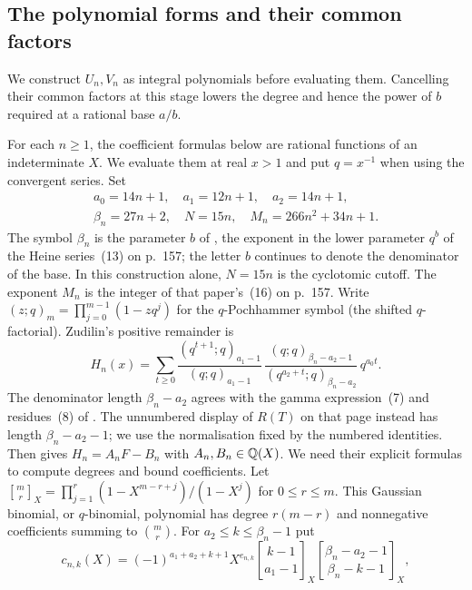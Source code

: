 \documentclass[11pt]{article}
\begin{document}
\subsection{The polynomial forms and their common factors}\label{long1049:sec:source-forms}

We construct $U_n,V_n$ as integral polynomials before evaluating
them. Cancelling their common factors at this stage lowers the degree
and hence the power of $b$ required at a rational base $a/b$.

For each $n\ge1$, the coefficient formulas below are rational functions
of an indeterminate $X$. We evaluate them at real $x>1$ and put $q=x^{-1}$
when using the convergent series. Set
\[
\begin{gathered}
 a_0=14n+1,\quad a_1=12n+1,\quad a_2=14n+1,\\
 \beta_n=27n+2,\quad N=15n,\quad M_n=266n^{2}+34n+1 .
\end{gathered}
\]
The symbol $\beta_n$ is the parameter $b$ of \cite[Sec.~3, p.~155]{zudilin2004},
the exponent in the lower parameter $q^{b}$ of the Heine series~(13) on p.~157;
the letter $b$ continues to
denote the denominator of the base. In this construction alone,
$N=15n$ is the cyclotomic cutoff. The exponent $M_n$ is the integer
of that paper's~(16) on p.~157. Write
$(z;q)_m=\prod_{j=0}^{m-1}(1-zq^{j})$ for the $q$-Pochhammer symbol
(the shifted $q$-factorial). Zudilin's positive remainder is
\begin{equation}\label{long1049:eq:positive-source-form}
 H_n(x)=\sum_{t\ge0}
 \frac{(q^{t+1};q)_{a_1-1}}{(q;q)_{a_1-1}}\,
 \frac{(q;q)_{\beta_n-a_2-1}}{(q^{a_2+t};q)_{\beta_n-a_2}}\,q^{a_0t}.
\end{equation}
The denominator length $\beta_n-a_2$ agrees with the gamma
expression~(7) and residues~(8) of \cite[p.~156]{zudilin2004}.
The unnumbered display of $R(T)$ on that page instead has length
$\beta_n-a_2-1$; we use the normalisation fixed by the numbered identities.
Then \cite[(8)--(11), pp.~156--157]{zudilin2004} gives $H_n=A_nF-B_n$ with
$A_n,B_n\in\mathbb{Q}(X)$. We need their explicit formulas to compute degrees
and bound coefficients. Let
$\genfrac{[}{]}{0pt}{}{m}{r}_X=\prod_{j=1}^{r}(1-X^{m-r+j})/(1-X^j)$
for $0\le r\le m$. This Gaussian binomial, or $q$-binomial, polynomial has degree
$r(m-r)$ and nonnegative coefficients summing to $\binom{m}{r}$. For
$a_2\le k\le\beta_n-1$ put
\begin{equation}\label{long1049:eq:c-explicit}
 c_{n,k}(X)=(-1)^{a_1+a_2+k+1}X^{e_{n,k}}
 \genfrac{[}{]}{0pt}{}{k-1}{a_1-1}_X
 \genfrac{[}{]}{0pt}{}{\beta_n-a_2-1}{\beta_n-k-1}_X,
\end{equation}
\end{document}
